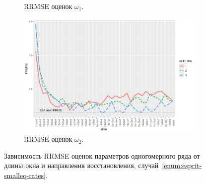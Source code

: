 \documentclass[specialist,
  substylefile=spbu.rtx,
subf,href,colorlinks=true, 12pt]{disser}
\theoremstyle{plain}
\theoremstyle{definition}
\theoremstyle{remark}
\begin{document}
\begin{figure}[!ht]
\begin{subfigure}{0.49\linewidth}
    \caption{RRMSE оценок $\omega_1$.}
    \label{fig:freq1_dims_small_eq_rates}
  \end{subfigure}
  \begin{subfigure}{0.49\linewidth}
    \includegraphics[width=\linewidth]{freq2_dims_small_eq_rates.pdf}
    \caption{RRMSE оценок $\omega_2$.}
    \label{fig:freq2_dims_small_eq_rates}
  \end{subfigure}
  \caption{Зависимость RRMSE оценок параметров одногомерного ряда
    от длины окна и направления восстановления,
  случай~\ref{enum:esprit-smalleq-rates}.}
  \label{fig:dims_small_eq_rates}
\end{figure}
\end{document}
